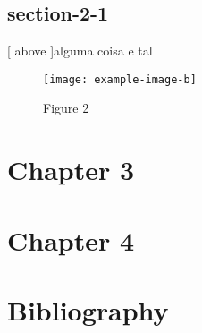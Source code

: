 \documentclass{book}
\begin{document}
\econ[2]

\section{section-2-1}

\clearpage{}
[ above ]{alguma coisa e tal}


\begin{figure}[hb]
  \centering
  \caption{Figure 2}
  \texttt{[image: example-image-b]}
\end{figure}


\hyperlink{figure.2.1}{}

\chapter{Chapter 3}

\econ[3]





\chapter{Chapter 4}

\econ[4]




\backmatter



\chapter{Bibliography}
\end{document}
